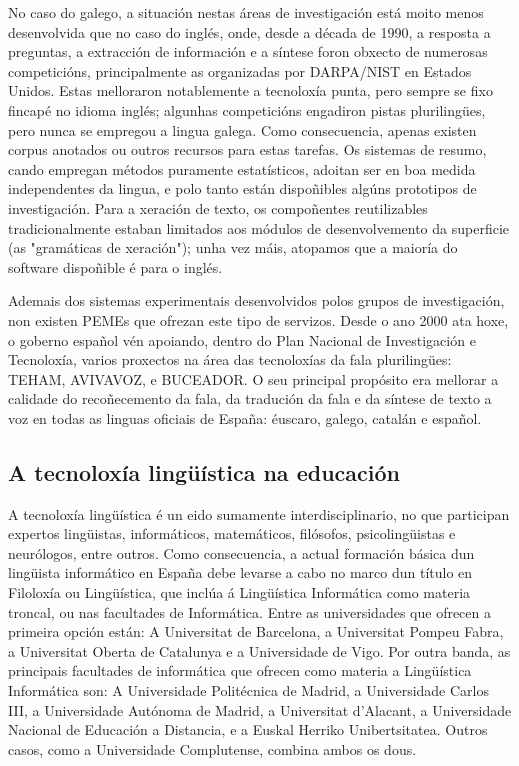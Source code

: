 \begin{multicols}{2}

No caso do galego, a situación nestas áreas de investigación está moito menos desenvolvida que no caso do inglés, onde, desde a década de 1990, a resposta a preguntas, a extracción de información e a síntese foron obxecto de numerosas competicións, principalmente as organizadas por DARPA/NIST en Estados Unidos. Estas melloraron notablemente a tecnoloxía punta, pero sempre se fixo fincapé no idioma inglés; algunhas competicións engadiron pistas plurilingües, pero nunca se empregou a lingua galega. Como consecuencia, apenas existen corpus anotados ou outros recursos para estas tarefas. Os sistemas de resumo, cando empregan métodos puramente estatísticos, adoitan ser en boa medida independentes da lingua, e polo tanto están dispoñibles algúns prototipos de investigación. Para a xeración de texto, os compoñentes reutilizables tradicionalmente estaban limitados aos módulos de desenvolvemento da superficie (as "gramáticas de xeración"); unha vez máis, atopamos que a maioría do software dispoñible é para o inglés. 

Ademais dos sistemas experimentais desenvolvidos polos grupos de investigación, non existen PEMEs que ofrezan este tipo de servizos. Desde o ano 2000 ata hoxe, o goberno español vén apoiando, dentro do Plan Nacional de Investigación e Tecnoloxía, varios proxectos na área das tecnoloxías da fala plurilingües: TEHAM, AVIVAVOZ, e BUCEADOR. O seu principal propósito era mellorar a calidade do recoñecemento da fala, da tradución da fala e da síntese de texto a voz en todas as linguas oficiais de España: éuscaro, galego, catalán e español.

\subsection{A tecnoloxía lingüística na educación}

   A tecnoloxía lingüística é un eido sumamente interdisciplinario, no que participan expertos lingüistas, informáticos, matemáticos, filósofos, psicolingüistas e neurólogos, entre outros. Como consecuencia, a actual formación básica dun lingüista informático en España debe levarse a cabo no marco dun título en Filoloxía ou Lingüística, que inclúa á Lingüística Informática como materia troncal, ou nas facultades de Informática. Entre as universidades que ofrecen a primeira opción están: A Universitat de Barcelona, a Universitat Pompeu Fabra, a Universitat Oberta de Catalunya e a Universidade de Vigo. Por outra banda, as principais facultades de informática que ofrecen como materia a Lingüística Informática son: A Universidade Politécnica de Madrid, a Universidade Carlos III, a Universidade Autónoma de Madrid, a Universitat d’Alacant, a Universidade Nacional de Educación a Distancia, e a Euskal Herriko Unibertsitatea. Outros casos, como a Universidade Complutense, combina ambos os dous.


\end{multicols}
